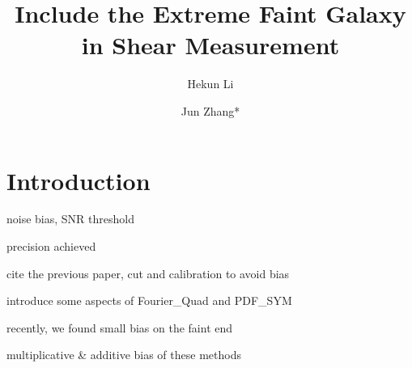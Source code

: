 \documentclass[twocolumn]{aastex62}
\begin{document}
\title{Include the Extreme Faint Galaxy in Shear Measurement}



\author{Hekun Li}
\author{Jun Zhang*}


\begin{abstract}



\end{abstract}




\section{Introduction} \label{sec:intro}
noise bias, SNR threshold

precision achieved

cite the previous paper, cut and calibration to avoid bias

introduce some aspects of Fourier\_Quad and PDF\_SYM

recently, we found small bias on the faint end

multiplicative \& additive bias of these methods
\end{document}
